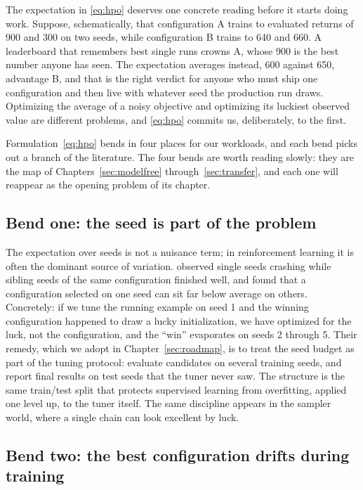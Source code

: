 The expectation in \eqref{eq:hpo} deserves one concrete reading before
it starts doing work. Suppose, schematically, that configuration A
trains to evaluated returns of 900 and 300 on two seeds, while
configuration B trains to 640 and 660. A leaderboard that remembers
best single runs crowns A, whose 900 is the best number anyone has
seen. The expectation averages instead, 600 against 650, advantage B,
and that is the right verdict for anyone who must ship one
configuration and then live with whatever seed the production run
draws. Optimizing the average of a noisy objective and optimizing its
luckiest observed value are different problems, and \eqref{eq:hpo}
commits us, deliberately, to the first.

Formulation~\eqref{eq:hpo} bends in four places for our workloads, and each
bend picks out a branch of the literature. The four bends are worth reading
slowly: they are the map of Chapters~\ref{sec:modelfree}
through~\ref{sec:transfer}, and each one will reappear as the opening
problem of its chapter.

\subsection{Bend one: the seed is part of the problem}

The expectation over seeds is not a nuisance term; in reinforcement
learning it is often the dominant source of variation.
\citet{eimer2023hyperparameters} observed single seeds crashing while sibling
seeds of the same configuration finished well, and found that a configuration
selected on one seed can sit far below average on others. Concretely: if we
tune the running example on seed 1 and the winning configuration happened to
draw a lucky initialization, we have optimized for the luck, not the
configuration, and the ``win'' evaporates on seeds 2 through 5. Their remedy,
which we adopt in Chapter~\ref{sec:roadmap}, is to treat the seed budget as
part of the tuning protocol: evaluate candidates on several training seeds,
and report final results on test seeds that the tuner never saw. The
structure is the same train/test split that protects supervised learning
from overfitting, applied one level up, to the tuner itself. The same
discipline appears in the sampler world, where a single chain can look
excellent by luck.

\subsection{Bend two: the best configuration drifts during training}

